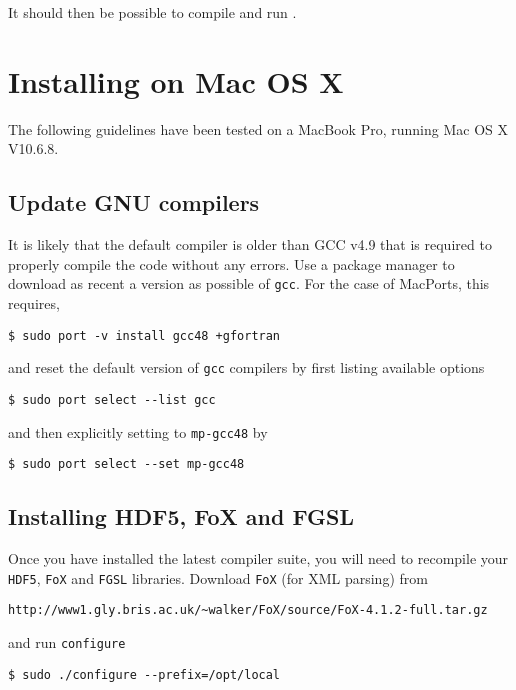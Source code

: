 It should then be possible to compile and run \glc.

\section{Installing on Mac OS X}

The following guidelines have been tested on a MacBook Pro, running Mac OS X V10.6.8. 

\subsection{Update GNU compilers}

It is likely that the default compiler is older than GCC v4.9 that is required to properly compile the code without any errors. Use a package manager to download as recent a version as possible of {\tt gcc}. For the case of MacPorts, this requires,

\begin{verbatim}
$ sudo port -v install gcc48 +gfortran
\end{verbatim}

and reset the default version of {\tt gcc} compilers by first listing available options

\begin{verbatim}
$ sudo port select --list gcc
\end{verbatim}

and then explicitly setting to {\tt mp-gcc48} by

\begin{verbatim}
$ sudo port select --set mp-gcc48
\end{verbatim}

\subsection{Installing HDF5, FoX and FGSL}

Once you have installed the latest compiler suite, you will need to recompile your {\tt HDF5}, {\tt FoX} and {\tt FGSL} libraries. Download {\tt FoX} (for XML parsing) from

\begin{verbatim}
http://www1.gly.bris.ac.uk/~walker/FoX/source/FoX-4.1.2-full.tar.gz
\end{verbatim}

and run {\tt configure}

\begin{verbatim}
$ sudo ./configure --prefix=/opt/local
\end{verbatim}

